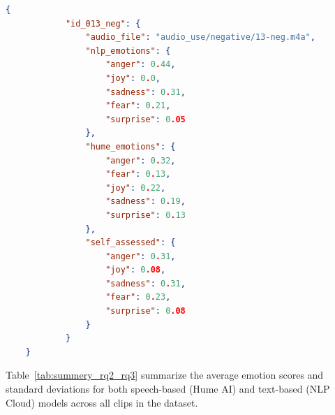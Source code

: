 \begin{center}
    \begin{minipage}{0.7\textwidth} 
    \begin{lstlisting}[language=json, caption={Example of stored JSON structure for Hume, NLP, Self-labeling.}]
        {
            "id_013_neg": {
                "audio_file": "audio_use/negative/13-neg.m4a",
                "nlp_emotions": {
                    "anger": 0.44,
                    "joy": 0.0,
                    "sadness": 0.31,
                    "fear": 0.21,
                    "surprise": 0.05
                },
                "hume_emotions": {
                    "anger": 0.32,
                    "fear": 0.13,
                    "joy": 0.22,
                    "sadness": 0.19,
                    "surprise": 0.13
                },
                "self_assessed": {
                    "anger": 0.31,
                    "joy": 0.08,
                    "sadness": 0.31,
                    "fear": 0.23,
                    "surprise": 0.08
                }
            }
    }
    \end{lstlisting}
    \label{tab:json_rq2_rq3}
\end{minipage}
\end{center} 

Table~\ref{tab:summery_rq2_rq3} summarize the average emotion scores and standard deviations for both speech-based (Hume AI) and text-based (NLP Cloud) 
models across all clips in the dataset. 


